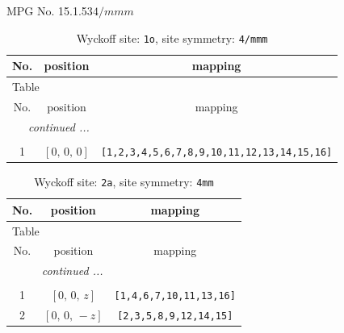 \documentclass[fleqn,8pt]{jsarticle}
\begin{document}
\setcounter{MaxMatrixCols}{32}

\renewcommand{\tablename}{Table~}
\renewcommand{\figurename}{Figure~}
\begin{center}
\LARGE
MPG No. 15.1.53\quad$4/mmm$
\end{center}
\renewcommand{\arraystretch}{1.2}
\begin{longtable}{ccc}
\caption{Wyckoff site: {\tt 1o}, site symmetry: {\tt 4/mmm}}
 \\
 \hline \hline
No. & position & mapping \\ \hline \endfirsthead

\multicolumn{2}{l}{\tablename\ \thetable{}} \\
 \hline \hline
No. & position & mapping \\ \hline \endhead

 \hline \hline
\multicolumn{2}{r}{\footnotesize\it continued ...} \\ \endfoot

 \hline \hline
\multicolumn{2}{r}{} \\ \endlastfoot

1 & $\left[ 0,\, 0,\, 0 \right]$ & {\tt [1,2,3,4,5,6,7,8,9,10,11,12,13,14,15,16]} \\
\end{longtable}
\renewcommand{\arraystretch}{1.2}
\begin{longtable}{ccc}
\caption{Wyckoff site: {\tt 2a}, site symmetry: {\tt 4mm}}
 \\
 \hline \hline
No. & position & mapping \\ \hline \endfirsthead

\multicolumn{2}{l}{\tablename\ \thetable{}} \\
 \hline \hline
No. & position & mapping \\ \hline \endhead

 \hline \hline
\multicolumn{2}{r}{\footnotesize\it continued ...} \\ \endfoot

 \hline \hline
\multicolumn{2}{r}{} \\ \endlastfoot

1 & $\left[ 0,\, 0,\, z \right]$ & {\tt [1,4,6,7,10,11,13,16]} \\ \hline
2 & $\left[ 0,\, 0,\, - z \right]$ & {\tt [2,3,5,8,9,12,14,15]} \\
\end{longtable}
\renewcommand{\arraystretch}{1.2}
\end{document}
